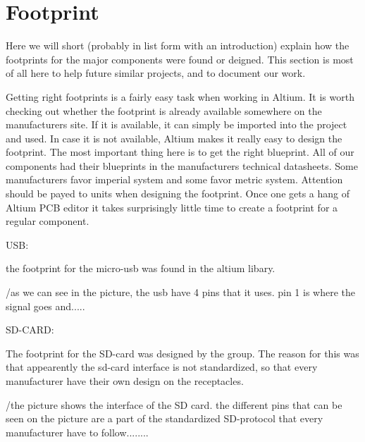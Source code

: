 \section {Footprint}

Here we will short (probably in list form with an introduction) explain how the footprints for the major components were found or deigned.
This section is most of all here to help future similar projects, and to document our work.

Getting right footprints is a fairly easy task when working in Altium.
It is worth checking out whether the footprint is already available somewhere on the manufacturers site.
If it is available, it can simply be imported into the project and used.
In case it is not available, Altium makes it really easy to design the footprint.
The most important thing here is to get the right blueprint.
All of our components had their blueprints in the manufacturers technical datasheets.
Some manufacturers favor imperial system and some favor metric system.
Attention should be payed to units when designing the footprint.
Once one gets a hang of Altium PCB editor it takes surprisingly little time to create a footprint for a regular component.


USB:

the footprint for the micro-usb was found in the altium libary. 


/as we can see in the picture, the usb have 4 pins that it uses. pin 1 is where the signal goes and.....

SD-CARD:

The footprint for the SD-card was designed by the group. The reason for this was that appearently the sd-card interface is not standardized, so that 
every manufacturer have their own design on the receptacles. 


/the picture shows the interface of the SD card. the different pins that can be seen on the picture are a part of the standardized SD-protocol that 
every manufacturer have to follow........
